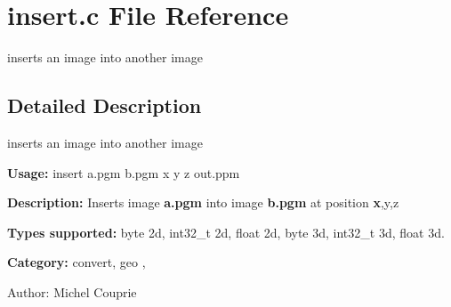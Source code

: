 \section{insert.c File Reference}
\label{insert_8c}
inserts an image into another image 



\subsection{Detailed Description}
inserts an image into another image 

{\bf Usage:} insert a.pgm b.pgm x y z out.ppm

{\bf Description:} Inserts image {\bf a.pgm} into image {\bf b.pgm} at position {\bf x},y,z

{\bf Types supported:} byte 2d, int32\_\-t 2d, float 2d, byte 3d, int32\_\-t 3d, float 3d.

{\bf Category:} convert, geo ,

\begin{Desc}
\item[Author:]Michel Couprie \end{Desc}
